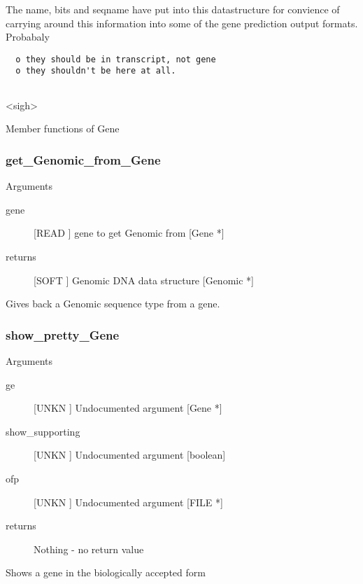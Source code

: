 The name, bits and seqname have put into this datastructure
for convience of carrying around this information into some
of the gene prediction output formats. Probabaly
\begin{verbatim}
  o they should be in transcript, not gene
  o they shouldn't be here at all.


\end{verbatim}
<sigh>




Member functions of Gene

\subsubsection{get_Genomic_from_Gene}

Arguments
\begin{description}
\item[gene] [READ ] gene to get Genomic from [Gene *]
\item[returns] [SOFT ] Genomic DNA data structure [Genomic *]
\end{description}
Gives back a Genomic sequence type
from a gene.


\subsubsection{show_pretty_Gene}

Arguments
\begin{description}
\item[ge] [UNKN ] Undocumented argument [Gene *]
\item[show_supporting] [UNKN ] Undocumented argument [boolean]
\item[ofp] [UNKN ] Undocumented argument [FILE *]
\item[returns] Nothing - no return value
\end{description}
Shows a gene in the biologically accepted form


